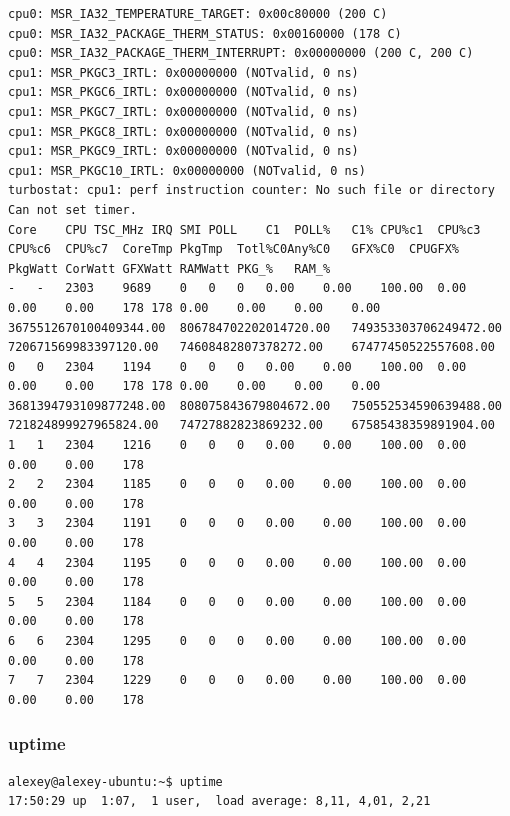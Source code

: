 \begin{verbatim}
cpu0: MSR_IA32_TEMPERATURE_TARGET: 0x00c80000 (200 C)
cpu0: MSR_IA32_PACKAGE_THERM_STATUS: 0x00160000 (178 C)
cpu0: MSR_IA32_PACKAGE_THERM_INTERRUPT: 0x00000000 (200 C, 200 C)
cpu1: MSR_PKGC3_IRTL: 0x00000000 (NOTvalid, 0 ns)
cpu1: MSR_PKGC6_IRTL: 0x00000000 (NOTvalid, 0 ns)
cpu1: MSR_PKGC7_IRTL: 0x00000000 (NOTvalid, 0 ns)
cpu1: MSR_PKGC8_IRTL: 0x00000000 (NOTvalid, 0 ns)
cpu1: MSR_PKGC9_IRTL: 0x00000000 (NOTvalid, 0 ns)
cpu1: MSR_PKGC10_IRTL: 0x00000000 (NOTvalid, 0 ns)
turbostat: cpu1: perf instruction counter: No such file or directory
Can not set timer.
Core	CPU	TSC_MHz	IRQ	SMI	POLL	C1	POLL%	C1%	CPU%c1	CPU%c3	CPU%c6	CPU%c7	CoreTmp	PkgTmp	Totl%C0Any%C0	GFX%C0	CPUGFX%	PkgWatt	CorWatt	GFXWatt	RAMWatt	PKG_%	RAM_%
-	-	2303	9689	0	0	0	0.00	0.00	100.00	0.00	0.00	0.00	178	178	0.00	0.00	0.00	0.00	3675512670100409344.00	806784702202014720.00	749353303706249472.00	720671569983397120.00	74608482807378272.00	67477450522557608.00
0	0	2304	1194	0	0	0	0.00	0.00	100.00	0.00	0.00	0.00	178	178	0.00	0.00	0.00	0.00	3681394793109877248.00	808075843679804672.00	750552534590639488.00	721824899927965824.00	74727882823869232.00	67585438359891904.00
1	1	2304	1216	0	0	0	0.00	0.00	100.00	0.00	0.00	0.00	178
2	2	2304	1185	0	0	0	0.00	0.00	100.00	0.00	0.00	0.00	178
3	3	2304	1191	0	0	0	0.00	0.00	100.00	0.00	0.00	0.00	178
4	4	2304	1195	0	0	0	0.00	0.00	100.00	0.00	0.00	0.00	178
5	5	2304	1184	0	0	0	0.00	0.00	100.00	0.00	0.00	0.00	178
6	6	2304	1295	0	0	0	0.00	0.00	100.00	0.00	0.00	0.00	178
7	7	2304	1229	0	0	0	0.00	0.00	100.00	0.00	0.00	0.00	178
\end{verbatim}
\subsubsection{uptime}
\begin{verbatim}
alexey@alexey-ubuntu:~$ uptime
17:50:29 up  1:07,  1 user,  load average: 8,11, 4,01, 2,21
\end{verbatim}
